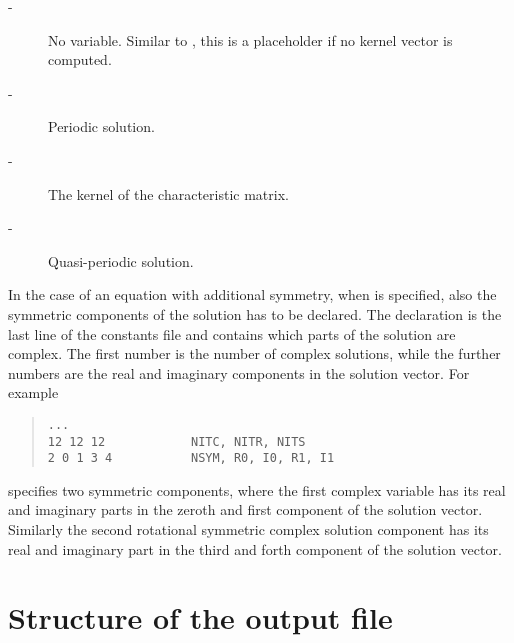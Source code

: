 \documentclass[10pt,a4paper]{ddedoc}
\begin{document}
\begin{description}
\begin{description}
\item[ -] No variable. Similar to , this is a placeholder if no kernel vector is computed.
\item[ -] Periodic solution.
\item[ -] The kernel of the characteristic matrix.
\item[ -] Quasi-periodic solution.
\end{description}
In the case of an equation with additional symmetry, when  is specified, also the symmetric components of the solution has to be declared.
The declaration is the last line of the constants file and contains which parts of the solution are complex. The first number is the number of complex solutions,
while the further numbers are the real and imaginary components in the solution vector. For example
{ \small \begin{quote} \begin{lstlisting}[basicstyle=\tt,frame=single]
...
12 12 12            NITC, NITR, NITS
2 0 1 3 4           NSYM, R0, I0, R1, I1
\end{lstlisting} \end{quote} } \noindent
specifies two symmetric components, where the first complex variable has its real and imaginary parts in the zeroth and first component of the solution vector.
Similarly the second rotational symmetric complex solution component has its real and imaginary part in the third and forth component of the solution vector.
\end{description}


\section{Structure of the output file}
\end{document}
